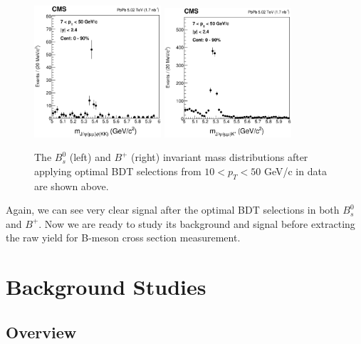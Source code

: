 \begin{figure}[h]
\begin{center}
\includegraphics[width=0.42\textwidth]{Figures/Chapter5/BsMassBDTCut.eps}
\includegraphics[width=0.42\textwidth]{Figures/Chapter5/BPMassBDTCut.eps}
\caption{The $B^0_s$ (left) and $B^+$ (right) invariant mass distributions after applying optimal BDT selections from $10 < p_T < 50$ GeV/c in data are shown above.}
\label{Bpeaks}
\end{center}
\end{figure}

Again, we can see very clear signal after the optimal BDT selections in both $B^0_s$ and $B^+$. Now we are ready to study its background and signal before extracting the raw yield for B-meson cross section measurement.

\section{Background Studies} 

\subsection{Overview}

